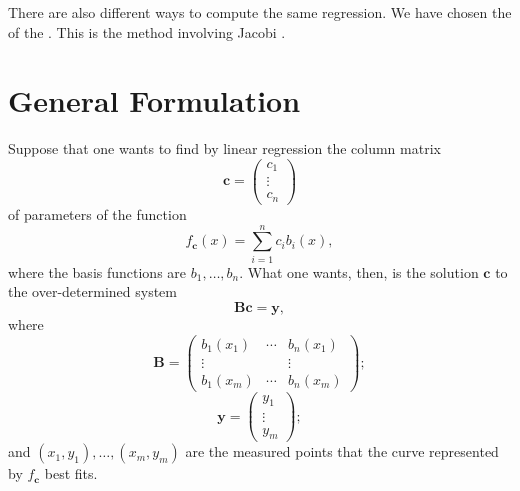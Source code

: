 \documentclass[twocolumn]{article}
\begin{document}
There are also different ways to compute the same regression. We have chosen
the 
of the .  This is the
method involving Jacobi .

\section{General Formulation}

Suppose that one wants to find by linear regression the column matrix
\begin{equation}
   \mathbf{c} =
   \begin{pmatrix}
      c_1\\
      \vdots\\
      c_n
   \end{pmatrix}
\end{equation}
of parameters of the function
\begin{equation}
   f_{\mathbf{c}}(x) = \sum_{i=1}^{n} c_i b_i(x),
\end{equation}
where the basis functions are $b_1, \ldots, b_n$. What one wants, then, is the
solution $\mathbf{c}$ to the over-determined system
\begin{equation}
   \mathbf{B} \mathbf{c} = \mathbf{y},
\end{equation}
where
\begin{equation}
   \mathbf{B} =
   \begin{pmatrix}
      b_1(x_1) & \cdots & b_n(x_1)\\
      \vdots   &        & \vdots\\
      b_1(x_m) & \cdots & b_n(x_m)
   \end{pmatrix};
\end{equation}
\begin{equation}
   \mathbf{y} =
   \begin{pmatrix}
      y_1\\
      \vdots\\
      y_m
   \end{pmatrix};
\end{equation}
and $(x_1,y_1), \ldots, (x_m,y_m)$ are the measured points that the curve
represented by $f_{\mathbf{c}}$ best fits.
\end{document}

